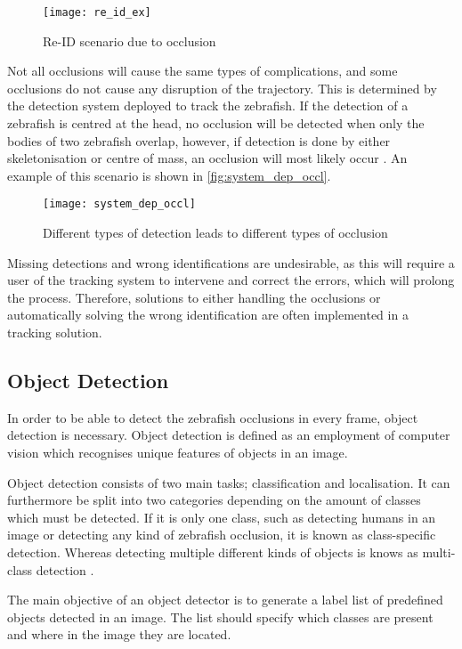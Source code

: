 \begin{figure}[H]
	\centering
	\texttt{[image: re\_id\_ex]}
	\caption{Re-ID scenario due to occlusion}
	\label{fig:re-id_Ex}
\end{figure}

Not all occlusions will cause the same types of complications, and some occlusions do not cause any disruption of the trajectory. This is determined by the detection system deployed to track the zebrafish. If the detection of a zebrafish is centred at the head, no occlusion will be detected when only the bodies of two zebrafish overlap, however, if detection is done by either skeletonisation or centre of mass, an occlusion will most likely occur \citep{Feijo2018}. An example of this scenario is shown in \autoref{fig:system_dep_occl}.

\begin{figure}[H]
	\centering
	\texttt{[image: system\_dep\_occl]}
	\caption{Different types of detection leads to different types of occlusion}
	\label{fig:system_dep_occl}
\end{figure}

Missing detections and wrong identifications are undesirable, as this will require a user of the tracking system to intervene and correct the errors, which will prolong the process. Therefore, solutions to either handling the occlusions or automatically solving the wrong identification are often implemented in a tracking solution.

\subsection{Object Detection}
In order to be able to detect the zebrafish occlusions in every frame, object detection is necessary. Object detection is defined as an employment of computer vision which recognises unique features of objects in an image.

Object detection consists of two main tasks; classification and localisation. It can furthermore be split into two categories depending on the amount of classes which must be detected. If it is only one class, such as detecting humans in an image or detecting any kind of zebrafish occlusion, it is known as class-specific detection. Whereas detecting multiple different kinds of objects is knows as multi-class detection  \citep{Zhang2013}.

The main objective of an object detector is to generate a label list of predefined objects detected in an image. The list should specify which classes are present and where in the image they are located.\\

